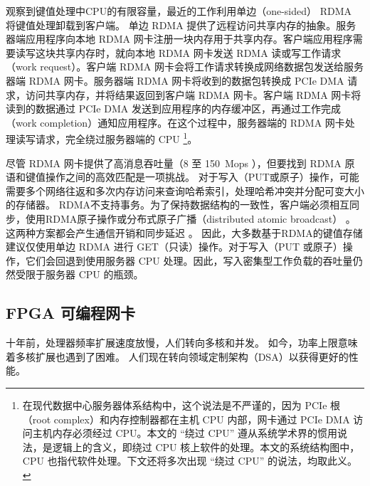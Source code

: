 观察到键值处理中CPU的有限容量，最近的工作利用单边（one-sided） RDMA 将键值处理卸载到客户端。
单边 RDMA 提供了远程访问共享内存的抽象。服务器端应用程序向本地 RDMA 网卡注册一块内存用于共享内存。客户端应用程序需要读写这块共享内存时，就向本地 RDMA 网卡发送 RDMA 读或写工作请求（work request）。客户端 RDMA 网卡会将工作请求转换成网络数据包发送给服务器端 RDMA 网卡。服务器端 RDMA 网卡将收到的数据包转换成 PCIe DMA 请求，访问共享内存，并将结果返回到客户端 RDMA 网卡。客户端 RDMA 网卡将读到的数据通过 PCIe DMA 发送到应用程序的内存缓冲区，再通过工作完成（work completion）通知应用程序。在这个过程中，服务器端的 RDMA 网卡处理读写请求，完全绕过服务器端的 CPU \footnote{在现代数据中心服务器体系结构中，这个说法是不严谨的，因为 PCIe 根（root complex）和内存控制器都在主机 CPU 内部，网卡通过 PCIe DMA 访问主机内存必须经过 CPU。本文的 ``绕过 CPU'' 遵从系统学术界的惯用说法，是逻辑上的含义，即绕过 CPU 核上软件的处理。本文的系统结构图中，CPU 也指代软件处理。下文还将多次出现 ``绕过 CPU'' 的说法，均取此义。}。

尽管 RDMA 网卡提供了高消息吞吐量（8 至 150~Mops \cite {kalia2016design}），但要找到 RDMA 原语和键值操作之间的高效匹配是一项挑战。
对于写入（PUT或原子）操作，可能需要多个网络往返和多次内存访问来查询哈希索引，处理哈希冲突并分配可变大小的存储器。
RDMA不支持事务。为了保持数据结构的一致性，客户端必须相互同步，使用RDMA原子操作或分布式原子广播（distributed atomic broadcast） \cite{szepesi2014designing}。这两种方案都会产生通信开销和同步延迟 \cite {mitchell2013using,dragojevic2014farm}。
因此，大多数基于RDMA的键值存储 \cite {mitchell2013using,dragojevic2014farm,kalia2014using} 建议仅使用单边 RDMA 进行 GET（只读）操作。对于写入（PUT 或原子）操作，它们会回退到使用服务器 CPU 处理。因此，写入密集型工作负载的吞吐量仍然受限于服务器 CPU 的瓶颈。

\iffalse
\subsection{FPGA 可编程网卡}
\label{kvdirect:sec:programmable-nic}

十年前，处理器频率扩展速度放慢，人们转向多核和并发\cite {sutter2005free}。
如今，功率上限意味着多核扩展也遇到了困难\cite {esmaeilzadeh2013power}。
人们现在转向领域定制架构（DSA）以获得更好的性能。


